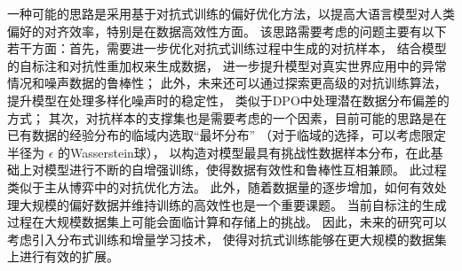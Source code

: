 一种可能的思路是采用基于对抗式训练的偏好优化方法，以提高大语言模型对人类偏好的对齐效率，特别是在数据高效性方面。
该思路需要考虑的问题主要有以下若干方面：首先，需要进一步优化对抗式训练过程中生成的对抗样本，
结合模型的自标注和对抗性重加权来生成数据，
进一步提升模型对真实世界应用中的异常情况和噪声数据的鲁棒性\citep{Esfahani2018Data}；
此外，未来还可以通过探索更高级的对抗训练算法，提升模型在处理多样化噪声时的稳定性，
类似于DPO中处理潜在数据分布偏差的方式\citep{rafailov2023direct}；
其次，对抗样本的支撑集也是需要考虑的一个因素，目前可能的思路是在已有数据的经验分布的临域内选取“最坏分布”
（对于临域的选择，可以考虑限定半径为 $\epsilon$ 的Wasserstein球），
以构造对模型最具有挑战性数据样本分布，在此基础上对模型进行不断的自增强训练，使得数据有效性和鲁棒性互相兼顾。
此过程类似于主从博弈中的对抗优化方法\citep{Bacsar1998Dynamic}。
此外，随着数据量的逐步增加，如何有效处理大规模的偏好数据并维持训练的高效性也是一个重要课题。
当前自标注的生成过程在大规模数据集上可能会面临计算和存储上的挑战。
因此，未来的研究可以考虑引入分布式训练和增量学习技术，
使得对抗式训练能够在更大规模的数据集上进行有效的扩展\citep{Villani2009Optimal}。

\newpage
\begingroup
    \printbibliography[title={参考文献}]
\endgroup